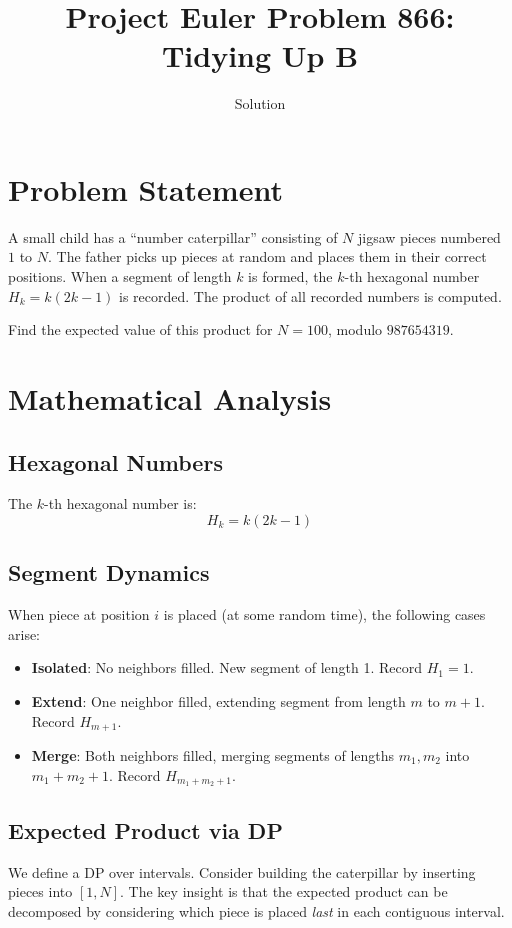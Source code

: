 \documentclass[12pt]{article}
\title{Project Euler Problem 866: Tidying Up B}
\author{Solution}
\date{}
\begin{document}
\maketitle

\section{Problem Statement}
A small child has a ``number caterpillar'' consisting of $N$ jigsaw pieces numbered $1$ to $N$. The father picks up pieces at random and places them in their correct positions. When a segment of length $k$ is formed, the $k$-th hexagonal number $H_k = k(2k-1)$ is recorded. The product of all recorded numbers is computed.

Find the expected value of this product for $N = 100$, modulo $987654319$.

\section{Mathematical Analysis}

\subsection{Hexagonal Numbers}
The $k$-th hexagonal number is:
\[
H_k = k(2k - 1)
\]

\subsection{Segment Dynamics}
When piece at position $i$ is placed (at some random time), the following cases arise:
\begin{itemize}
    \item \textbf{Isolated}: No neighbors filled. New segment of length 1. Record $H_1 = 1$.
    \item \textbf{Extend}: One neighbor filled, extending segment from length $m$ to $m+1$. Record $H_{m+1}$.
    \item \textbf{Merge}: Both neighbors filled, merging segments of lengths $m_1, m_2$ into $m_1 + m_2 + 1$. Record $H_{m_1+m_2+1}$.
\end{itemize}

\subsection{Expected Product via DP}
We define a DP over intervals. Consider building the caterpillar by inserting pieces into $[1, N]$. The key insight is that the expected product can be decomposed by considering which piece is placed \emph{last} in each contiguous interval.
\end{document}
